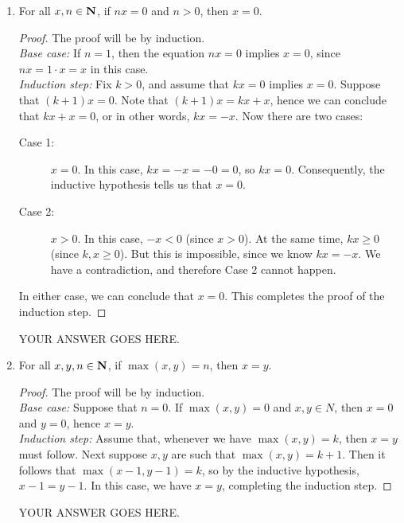 \documentclass[11pt,fleqn]{article}
\begin{document}
\begin{enumerate}
\begin{enumerate}
\item
\begin{theorem}
For all $x,n\in \mbox{{\bfseries N}}$, if $nx=0$ and $n>0$, then $x=0$.
\end{theorem}
\begin{proof}
The proof will be by induction.\\
\emph{Base case:} If $n=1$, then the equation $nx=0$
implies $x=0$, since $nx=1\cdot x=x$ in this case.\\
\emph{Induction step:} Fix $k>0$, and assume that $kx=0$ implies $x=0$.
Suppose that $(k+1)x=0$.
Note that $(k+1)x=kx+x$, hence we can conclude that $kx+x=0$,
or in other words, $kx=-x$.
Now there are two cases:
\begin{description}
\item[Case 1:] $x=0$. In this case, $kx=-x=-0=0$, so $kx=0$.
Consequently, the inductive hypothesis tells us that $x=0$.
\item[Case 2:] $x>0$. In this case, $-x<0$ (since $x>0$).
At the same time, $kx\ge 0$ (since $k,x \ge 0$).
But this is impossible, since we know $kx=-x$.
We have a contradiction, and therefore Case 2 cannot happen.
\end{description}
In either case, we can conclude that $x=0$.
This completes the proof of the induction step.
\end{proof}

YOUR ANSWER GOES HERE.

\item
\begin{theorem}
For all $x,y,n\in \mbox{{\bfseries N}}$, if $\max(x,y)=n$, then $x=y$.
\end{theorem}
\begin{proof}
The proof will be by induction.\\
\emph{Base case:} Suppose that $n=0$.  If $\max(x,y)=0$
and $x,y\in N$, then $x=0$ and $y=0$, hence $x=y$.\\
\emph{Induction step:} Assume that, whenever
we have $\max(x,y)=k$, then $x=y$ must follow.
Next suppose $x,y$ are such that $\max(x,y)=k+1$.
Then it follows that $\max(x-1,y-1)=k$, so by the inductive
hypothesis, $x-1=y-1$.
In this case, we have $x=y$, completing the induction step.
\end{proof}

YOUR ANSWER GOES HERE.


\end{enumerate}
\end{enumerate}
\end{document}
